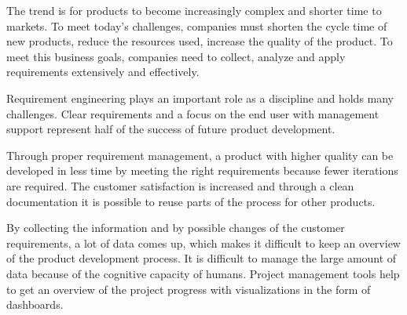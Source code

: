     The trend is for products to become increasingly complex and shorter time to markets.
    To meet today's challenges, companies must shorten the cycle time of new products, reduce the resources used, increase the quality of the product. To meet this business goals, companies need to collect, analyze and apply requirements extensively and effectively.

    Requirement engineering plays an important role as a discipline and holds many challenges. Clear requirements and a focus on the end user with management support represent half of the success of future product development. 

    Through proper requirement management, a product with higher quality can be developed in less time by meeting the right requirements because fewer iterations are required. The customer satisfaction is increased and through a clean documentation it is possible to reuse parts of the process for other products.

    By collecting the information and by possible changes of the customer requirements, a lot of data comes up, which makes it difficult to keep an overview of the product development process. It is difficult to manage the large amount of data because of the cognitive capacity of humans. Project management tools help to get an overview of the project progress with visualizations in the form of dashboards. 

